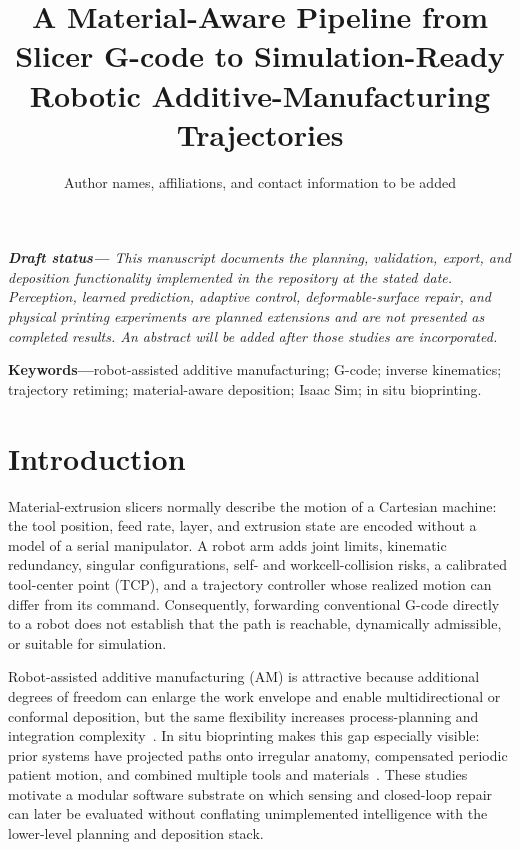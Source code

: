 \documentclass[letterpaper,10pt,conference]{ieeeconf}
\title{\LARGE\bfseries A Material-Aware Pipeline from Slicer G-code to
Simulation-Ready Robotic Additive-Manufacturing Trajectories}
\author{Author names, affiliations, and contact information to be added}
\begin{document}
\maketitle
\thispagestyle{empty}
\pagestyle{empty}

\noindent\textit{\textbf{Draft status---}
This manuscript documents the planning, validation, export, and deposition
functionality implemented in the repository at the stated date.  Perception,
learned prediction, adaptive control, deformable-surface repair, and physical
printing experiments are planned extensions and are not presented as completed
results.  An abstract will be added after those studies are incorporated.}

\noindent\textbf{Keywords---}robot-assisted additive manufacturing; G-code;
inverse kinematics; trajectory retiming; material-aware deposition; Isaac Sim;
in situ bioprinting.

\section{Introduction}

Material-extrusion slicers normally describe the motion of a Cartesian machine:
the tool position, feed rate, layer, and extrusion state are encoded without a
model of a serial manipulator.  A robot arm adds joint limits, kinematic
redundancy, singular configurations, self- and workcell-collision risks, a
calibrated tool-center point (TCP), and a trajectory controller whose realized
motion can differ from its command.  Consequently, forwarding conventional
G-code directly to a robot does not establish that the path is reachable,
dynamically admissible, or suitable for simulation.

Robot-assisted additive manufacturing (AM) is attractive because additional
degrees of freedom can enlarge the work envelope and enable multidirectional or
conformal deposition, but the same flexibility increases process-planning and
integration complexity~\cite{urhal2019robot,bhatt2020expanding}.  In situ
bioprinting makes this gap especially visible: prior systems have projected
paths onto irregular anatomy, compensated periodic patient motion, and combined
multiple tools and materials~\cite{fortunato2021platform,fortunato2022motion,
guerra2025multimaterial}.  These studies motivate a modular software substrate
on which sensing and closed-loop repair can later be evaluated without
conflating unimplemented intelligence with the lower-level planning and
deposition stack.
\end{document}
